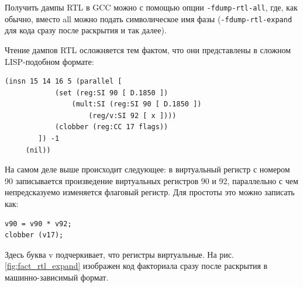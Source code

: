\documentclass[a4paper,12pt,oneside]{article}
\begin{document}
Получить дампы RTL в GCC можно с помощью опции \lstinline!-fdump-rtl-all!, где, как обычно, вместо all можно подать символическое имя фазы (\lstinline!-fdump-rtl-expand! для кода сразу после раскрытия и так далее).

Чтение дампов RTL осложняется тем фактом, что они представлены в сложном LISP-подобном формате:

\begin{verbatim}
(insn 15 14 16 5 (parallel [
            (set (reg:SI 90 [ D.1850 ])
                (mult:SI (reg:SI 90 [ D.1850 ])
                    (reg/v:SI 92 [ x ])))
            (clobber (reg:CC 17 flags))
        ]) -1
     (nil))
\end{verbatim}

На самом деле выше происходит следующее: в виртуальный регистр с номером 90 записывается произведение виртуальных регистров 90 и 92, параллельно с чем непредсказуемо изменяется флаговый регистр. Для простоты это можно записать как:

\begin{lstlisting}
v90 = v90 * v92;
clobber (v17);
\end{lstlisting}

Здесь буква v подчеркивает, что регистры виртуальные. На рис. \ref{fig:fact_rtl_expand} изображен код факториала сразу после раскрытия в машинно-зависимый формат.
\end{document}
